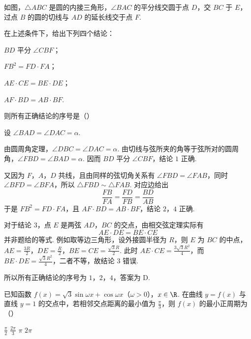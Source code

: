 \begin{problem}
如图，\(\triangle ABC\) 是圆的内接三角形，\(\angle BAC\) 的平分线交圆于点 \(D\)，交 \(BC\) 于 \(E\)，过点 \(B\) 的圆的切线与 \(AD\) 的延长线交于点 \(F\).


在上述条件下，给出下列四个结论：

\begin{circlelist}
\item \(BD\) 平分 \(\angle CBF\)；
\item \(FB^{2} = FD \cdot FA\)；
\item \(AE \cdot CE = BE \cdot DE\)；
\item \(AF \cdot BD = AB \cdot BF\).
\end{circlelist}

则所有正确结论的序号是（\quad）

\choices
    {}
    {}
    {}
    {}
\end{problem}


\begin{solution}
设 \(\angle BAD=\angle DAC=\alpha\).

由圆周角定理，\(\angle DBC=\angle DAC=\alpha\). 由切线与弦所夹的角等于弦所对的圆周角，\(\angle FBD=\angle BAD=\alpha\). 因而 \(BD\) 平分 \(\angle CBF\)，结论 \(1\) 正确.

又因为 \(F\)，\(A\)，\(D\) 共线，且由同样的弦切角关系有 \(\angle FBD=\angle FAB\)，同时 \(\angle BFD=\angle BFA\)，所以 \(\triangle FBD\sim\triangle FAB\). 对应边给出
\[
\frac{FB}{FA}=\frac{FD}{FB}=\frac{BD}{AB}
\]
于是 \(FB^2=FD\cdot FA\)，且 \(AF\cdot BD=AB\cdot BF\)，结论 \(2\)，\(4\) 正确.

对于结论 \(3\)，点 \(E\) 是两弦 \(AD\)，\(BC\) 的交点，由相交弦定理实际有
\[
AE\cdot DE=BE\cdot CE
\]
并非题给的等式. 例如取等边三角形，设外接圆半径为 \(R\)，则 \(E\) 为 \(BC\) 的中点，\(AE=\frac{3R}{2}\)，\(DE=\frac R2\)，\(BE=CE=\frac{\sqrt3R}{2}\). 此时 \(AE\cdot CE=\frac{3\sqrt3R^2}{4}\)，而 \(BE\cdot DE=\frac{\sqrt3R^2}{4}\)，二者不等，故结论 \(3\) 错误.

所以所有正确结论的序号为 \(1\)，\(2\)，\(4\)，答案为 D.
\end{solution}

\begin{problem}
已知函数 \( f(x) = \sqrt{3}\sin \omega x + \cos \omega x \)（\(\omega > 0\)），\(x \in \R\). 在曲线 \( y = f(x) \) 与直线 \( y = 1 \) 的交点中，若相邻交点距离的最小值为 \( \frac{\pi}{3} \)，则 \( f(x) \) 的最小正周期为（\quad）

\choices
    {\(\frac{\pi}{2}\)}
    {\(\frac{2\pi}{3}\)}
    {\(\pi\)}
    {\(2\pi\)}
\end{problem}

